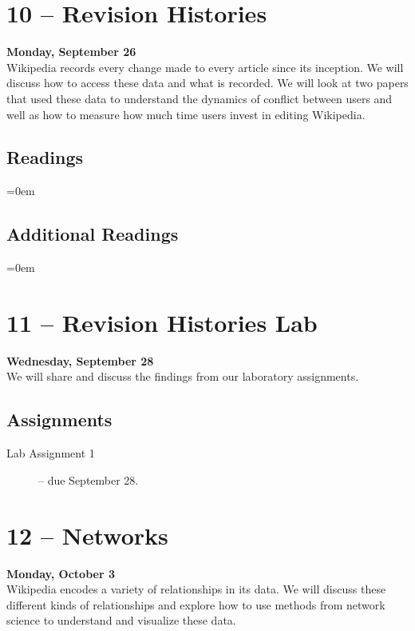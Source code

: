 \documentclass[10pt]{memoir}
\newenvironment{readinglist}{
\begin{list}{}{\leftmargin=8pt \itemindent=0em}
  \setlength{\itemsep}{8pt}
  \setlength{\parskip}{0em}
  \setlength{\parsep}{1em}
  \setlength{\parindent}{8em}}
{\end{list}}
\begin{document}
\section{10 -- Revision Histories}
\textcolor{CUGold}{\textbf{Monday, September 26}}\\
Wikipedia records every change made to every article since its inception. We will discuss how to access these data and what is recorded. We will look at two papers that used these data to understand the dynamics of conflict between users and well as how to measure how much time users invest in editing Wikipedia.

    \subsection{Readings}
    \begin{readinglist}
        \item {}
        \item {}
    \end{readinglist}
    
    \subsection{Additional Readings}
    \begin{readinglist}
        \item {}
    \end{readinglist}

\section{11 -- Revision Histories Lab}
\textcolor{CUGold}{\textbf{Wednesday, September 28}}\\
We will share and discuss the findings from our laboratory assignments.

    \subsection{Assignments}
    \begin{description}%
        \item[Lab Assignment 1 ] -- due September 28. 
    \end{description}

\section{12 -- Networks}
\textcolor{CUGold}{\textbf{Monday, October 3}}\\
Wikipedia encodes a variety of relationships in its data. We will discuss these different kinds of relationships and explore how to use methods from network science to understand and visualize these data. 
\end{document}
